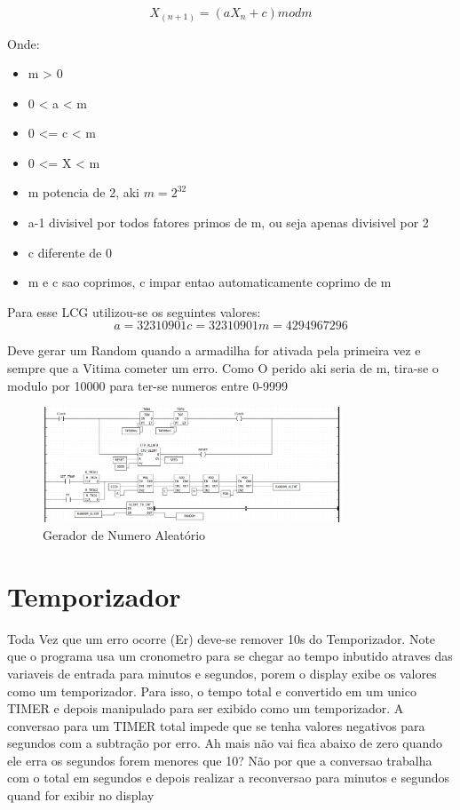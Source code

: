 \begin{equation}
X_{(n+1)} = (aX_n + c)mod m
\end{equation}

Onde:
\begin{itemize} 
  \item m > 0
  \item 0 < a < m
  \item 0 <= c < m
  \item 0 <= X < m
  \item m potencia de 2, aki $ m = 2^{32} $
  \item a-1 divisivel por todos fatores primos de m, ou seja apenas divisivel por 2
  \item c diferente de 0
  \item m e c sao coprimos, c impar entao automaticamente coprimo de m
\end{itemize}

Para esse LCG utilizou-se os seguintes valores:
\begin{equation}
   a = 32310901
   c = 32310901
   m = 4294967296
\end{equation}

Deve gerar um Random quando a armadilha for ativada pela primeira vez e sempre que a Vitima cometer um erro. Como O perido aki seria de m, tira-se o modulo por 10000 para ter-se numeros entre 0-9999

\begin{figure}[H]
    \centering
    \includegraphics[width=0.8\textwidth]{images/random_generator.png}
    \caption{Gerador de Numero Aleatório}
    \label{fig:gerador_de_numero_aleatorio}
\end{figure}

\section{Temporizador}
Toda Vez que um erro ocorre (Er) deve-se remover 10s do Temporizador. Note que o programa usa um cronometro para se chegar ao tempo inbutido atraves das variaveis de entrada para minutos e segundos, porem o display exibe os valores como um temporizador. Para isso, o tempo total e convertido em um unico TIMER e depois manipulado para ser exibido como um temporizador.
A conversao para um TIMER total impede que se tenha valores negativos para segundos com a subtração por erro.
Ah mais não vai fica abaixo de zero quando ele erra os segundos forem menores que 10?
Não por que a conversao trabalha com o total em segundos e depois realizar a reconversao para minutos e segundos quand for exibir no display

